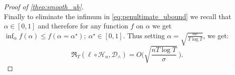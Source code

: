\begin{proof}[Proof of \cref{theo:smooth_ub}]
\begin{equation}
\end{equation}
Finally to eliminate the infimum in \cref{eq:penultimate_ubound} we recall that $\alpha \in [0,1]$ and therefore for any function $f$ on $\alpha$ we get $\inf_{\alpha} f(\alpha) \leq f (\alpha = \alpha^\star); \ \alpha^\star \in [0,1]$. Thus setting $\alpha = \sqrt{\frac{n \sigma}{T \log T}}$, we get:
\begin{equation}
    \mathfrak{R}_T(\ell \circ \mathcal{H}_n, \mathcal{D}_\wedge) = O \Bigg(\sqrt{\frac{nT \log T}{\sigma}} \ \Bigg).
\end{equation}
\end{proof}

